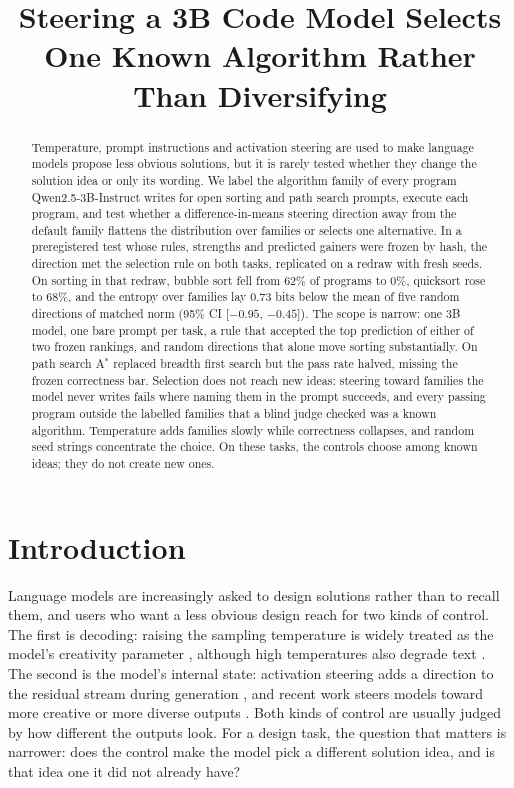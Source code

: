 \documentclass[11pt,letterpaper]{article}
\title{Steering a 3B Code Model Selects One Known Algorithm Rather Than Diversifying}
\author{}
\date{}
\newcommand{\Astar}{A$^{*}$}
\begin{document}
\maketitle

\begin{abstract}
Temperature, prompt instructions and activation steering are used to make language models propose less obvious solutions, but it is rarely tested whether they change the solution idea or only its wording. We label the algorithm family of every program Qwen2.5-3B-Instruct writes for open sorting and path search prompts, execute each program, and test whether a difference-in-means steering direction away from the default family flattens the distribution over families or selects one alternative. In a preregistered test whose rules, strengths and predicted gainers were frozen by hash, the direction met the selection rule on both tasks, replicated on a redraw with fresh seeds. On sorting in that redraw, bubble sort fell from 62\% of programs to 0\%, quicksort rose to 68\%, and the entropy over families lay 0.73 bits below the mean of five random directions of matched norm (95\% CI [$-0.95$, $-0.45$]). The scope is narrow: one 3B model, one bare prompt per task, a rule that accepted the top prediction of either of two frozen rankings, and random directions that alone move sorting substantially. On path search \Astar{} replaced breadth first search but the pass rate halved, missing the frozen correctness bar. Selection does not reach new ideas: steering toward families the model never writes fails where naming them in the prompt succeeds, and every passing program outside the labelled families that a blind judge checked was a known algorithm. Temperature adds families slowly while correctness collapses, and random seed strings concentrate the choice. On these tasks, the controls choose among known ideas; they do not create new ones.
\end{abstract}

\section{Introduction}
\label{sec:intro}

Language models are increasingly asked to design solutions rather than to recall them, and users who want a less obvious design reach for two kinds of control. The first is decoding: raising the sampling temperature is widely treated as the model's creativity parameter \citep{Peeperkorn2024}, although high temperatures also degrade text \citep{Holtzman2019}. The second is the model's internal state: activation steering adds a direction to the residual stream during generation \citep{Turner2023,Rimsky2024}, and recent work steers models toward more creative or more diverse outputs \citep{Olson2024,Zhu2026,Khanh2025}. Both kinds of control are usually judged by how different the outputs look. For a design task, the question that matters is narrower: does the control make the model pick a different solution idea, and is that idea one it did not already have?
\end{document}
